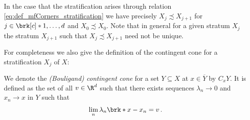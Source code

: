 In the case that the stratification arises through relation \eqref{eq:def_mfCorners_stratification}
we have precisely $X_{j}\precsim X_{j+1}$ for $j\in\brk[c]*{1,\dots,d}$ and $X_0\precsim X_0$.
Note that in general for a given stratum $X_j$ the stratum $X_{j+1}$ such that $X_j\precsim X_{j+1}$ need not be unique.

For completeness we also give the definition of the contingent cone for a 
stratification $X_j$ of $X$:
\begin{definition}
  We denote the \emph{(Bouligand) contingent cone} for a set $Y\subseteq X$ at $x\in\overline{Y}$ by $C_xY$.
  It is defined as the set of all $v\in\R^d$ such that there exists sequences $\lambda_n\to0$ and $x_n\to x$ in
  $Y$ such that
  $$\lim_n\lambda_n\brk*{x-x_n}=v\,.$$
\end{definition}

